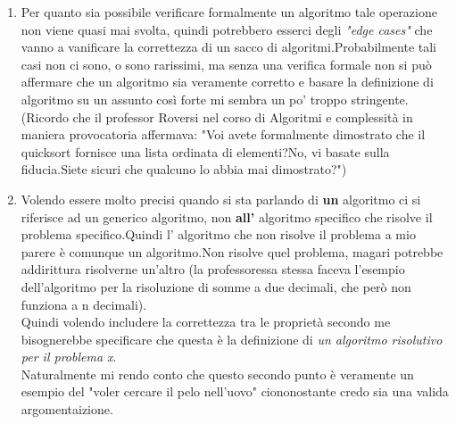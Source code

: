 \documentclass[a4paper]{article}
\begin{document}
\begin{enumerate}
	\item Per quanto sia possibile verificare formalmente un algoritmo tale operazione non viene quasi mai svolta, quindi potrebbero esserci degli \textit{"edge cases"} che vanno a vanificare la correttezza di un sacco di algoritmi.Probabilmente tali casi non ci sono, o sono rarissimi, ma senza una verifica formale non si può affermare che un algoritmo sia veramente corretto e basare la definizione di algoritmo su un assunto così forte mi sembra un po' troppo stringente.
		(Ricordo che il professor Roversi nel corso di Algoritmi e complessità in maniera provocatoria affermava: "Voi avete formalmente dimostrato che il quicksort fornisce una lista ordinata di elementi?No, vi basate sulla fiducia.Siete sicuri che qualcuno lo abbia mai dimostrato?")
	\item Volendo essere molto precisi quando si sta parlando di \textbf{un} algoritmo ci si riferisce ad un generico algoritmo, non \textbf{all'} algoritmo specifico che risolve il problema specifico.Quindi l' algoritmo che non risolve il problema a mio parere è comunque un algoritmo.Non risolve quel problema, magari potrebbe addirittura risolverne un'altro (la professoressa stessa faceva l'esempio dell'algoritmo per la risoluzione di somme a due decimali, che però non funziona a n decimali).\\
		Quindi volendo includere la correttezza tra le proprietà secondo me bisognerebbe specificare che questa è la definizione di \textit{un algoritmo risolutivo per il problema x}.\\
	Naturalmente mi rendo conto che questo secondo punto è veramente un esempio del "voler cercare il pelo nell'uovo" ciononostante credo sia una valida argomentaizione.
\end{enumerate}
\end{document}
